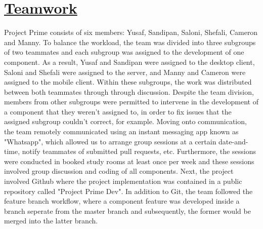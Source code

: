 \documentclass{article}
\begin{document}
\section{\underline{Teamwork}}
Project Prime consists of six members: Yusaf, Sandipan, Saloni, Shefali, Cameron and Manny. To balance the workload, the team was divided into three subgroups of two teammates and each subgroup was assigned to the development of one component. As a result, Yusaf and Sandipan were assigned to the desktop client, Saloni and Shefali were assigned to the server, and Manny and Cameron were assigned to the mobile client. Within these subgroups, the work was distributed between both teammates through through discussion. Despite the team division, members from other subgroups were permitted to intervene in the development of a component that they weren't assigned to, in order to fix issues that the assigned subgroup couldn't correct, for example. Moving onto communication, the team remotely communicated using an instant messaging app known as "Whatsapp", which allowed us to arrange group sessions at a certain date-and-time, notify teammates of submitted pull requests, etc. Furthermore, the sessions were conducted in booked study rooms at least once per week and these sessions involved group discussion and coding of all components. Next, the project involved Github where the project implementation was contained in a public repository called "Project Prime Dev". In addition to Git, the team followed the feature branch workflow, where a component feature was developed inside a branch seperate from the master branch and subsequently, the former would be merged into the latter branch.
\end{document}

